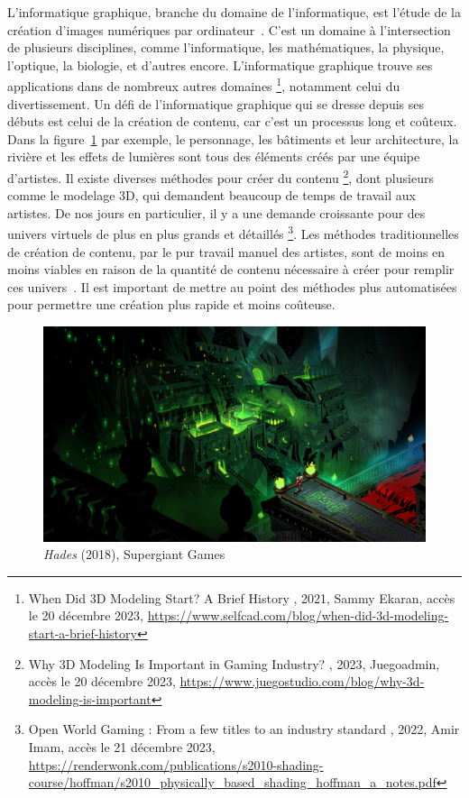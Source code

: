 \Introduction
\label{ch:introduction}

L'informatique graphique, branche du domaine de l'informatique, est l'étude de la création d'images numériques par ordinateur~\cite{poinssac_infographie_1994}. C'est un domaine à l'intersection de plusieurs disciplines, comme l'informatique, les mathématiques, la physique, l'optique, la biologie, et d'autres encore. L'informatique graphique trouve ses applications dans de nombreux autres domaines \footnote{\og When Did 3D Modeling Start? A Brief History \fg, 2021, Sammy Ekaran, accès le 20 décembre 2023, \url{https://www.selfcad.com/blog/when-did-3d-modeling-start-a-brief-history}}, notamment celui du divertissement. Un défi de l'informatique graphique qui se dresse depuis ses débuts est celui de la création de contenu, car c'est un processus long et coûteux. Dans la figure~\ref{fig:hades} par exemple, le personnage, les bâtiments et leur architecture, la rivière et les effets de lumières sont tous des éléments créés par une équipe d'artistes. Il existe diverses méthodes pour créer du contenu \footnote{\og Why 3D Modeling Is Important in Gaming Industry? \fg, 2023, Juegoadmin, accès le 20 décembre 2023, \url{https://www.juegostudio.com/blog/why-3d-modeling-is-important}}, dont plusieurs comme le modelage 3D, qui demandent beaucoup de temps de travail aux artistes. De nos jours en particulier, il y a une demande croissante pour des univers virtuels de plus en plus grands et détaillés \footnote{\og Open World Gaming : From a few titles to an industry standard \fg, 2022, Amir Imam, accès le 21 décembre 2023, \url{https://renderwonk.com/publications/s2010-shading-course/hoffman/s2010_physically_based_shading_hoffman_a_notes.pdf}}. Les méthodes traditionnelles de création de contenu, par le pur travail manuel des artistes, sont de moins en moins viables en raison de la quantité de contenu nécessaire à créer pour remplir ces univers~\cite{freiknecht_survey_2017}. Il est important de mettre au point des méthodes plus automatisées pour permettre une création plus rapide et moins coûteuse.

\bigskip

\begin{figure}[!h]
    \centering
    \includegraphics[width=.85\textwidth]{contenu/resources/images/hades}
    \caption[\textit{Hades} (2018), Supergiant Games]{\textit{Hades} (2018), Supergiant Games~\cite{supergiant_hades_2018}}
    \label{fig:hades}
\end{figure}

